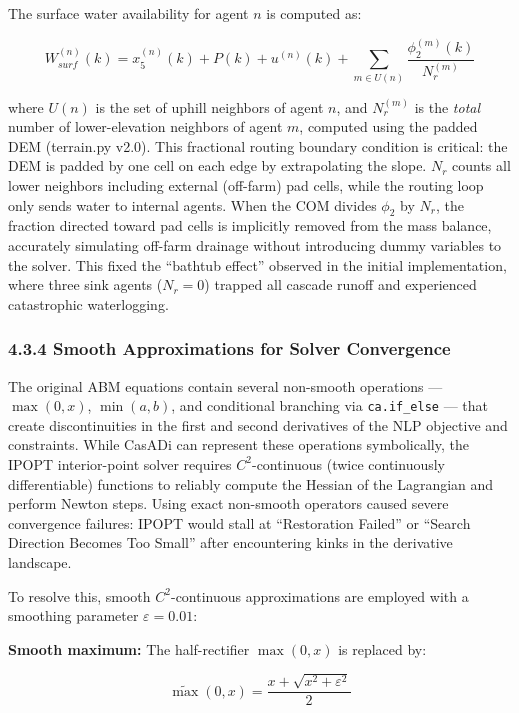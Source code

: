 The surface water availability for agent \(n\) is computed as:

\[W_{surf}^{(n)}(k) = x_5^{(n)}(k) + P(k) + u^{(n)}(k) + \sum_{m \in U(n)} \frac{\phi_2^{(m)}(k)}{N_r^{(m)}} \tag{17}\]

where \(U(n)\) is the set of uphill neighbors of agent \(n\), and
\(N_r^{(m)}\) is the \emph{total} number of lower-elevation neighbors of
agent \(m\), computed using the padded DEM (terrain.py v2.0). This
fractional routing boundary condition is critical: the DEM is padded by
one cell on each edge by extrapolating the slope. \(N_r\) counts all
lower neighbors including external (off-farm) pad cells, while the
routing loop only sends water to internal agents. When the COM divides
\(\phi_2\) by \(N_r\), the fraction directed toward pad cells is
implicitly removed from the mass balance, accurately simulating off-farm
drainage without introducing dummy variables to the solver. This fixed
the ``bathtub effect'' observed in the initial implementation, where
three sink agents (\(N_r = 0\)) trapped all cascade runoff and
experienced catastrophic waterlogging.

\subsubsection{4.3.4 Smooth Approximations for Solver
Convergence}\label{smooth-approximations-for-solver-convergence}

The original ABM equations contain several non-smooth operations ---
\(\max(0, x)\), \(\min(a, b)\), and conditional branching via
\texttt{ca.if\_else} --- that create discontinuities in the first and
second derivatives of the NLP objective and constraints. While CasADi
can represent these operations symbolically, the IPOPT interior-point
solver requires \(C^2\)-continuous (twice continuously differentiable)
functions to reliably compute the Hessian of the Lagrangian and perform
Newton steps. Using exact non-smooth operators caused severe convergence
failures: IPOPT would stall at ``Restoration Failed'' or ``Search
Direction Becomes Too Small'' after encountering kinks in the derivative
landscape.

To resolve this, smooth \(C^2\)-continuous approximations are employed
with a smoothing parameter \(\varepsilon = 0.01\):

\textbf{Smooth maximum:} The half-rectifier \(\max(0, x)\) is replaced
by:

\[\widetilde{\max}(0, x) = \frac{x + \sqrt{x^2 + \varepsilon^2}}{2} \tag{18}\]

